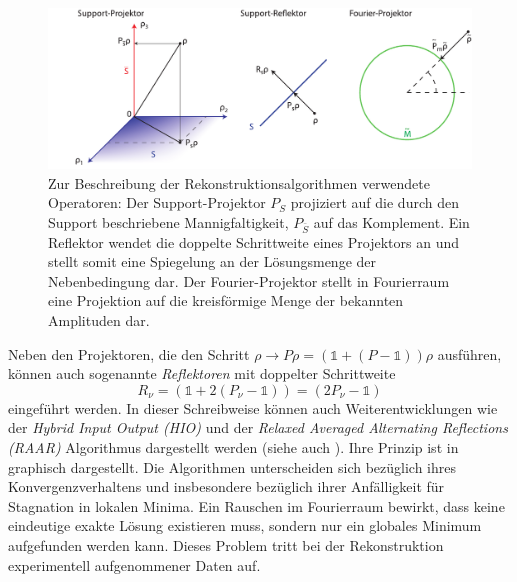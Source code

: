 \begin{figure}
	\centering
	\includegraphics[width=1\textwidth]{images/projektor.pdf}
	\caption[Operatoren zur Beschreibung der Rekonstruktionsalgorithmen]{Zur Beschreibung der Rekonstruktionsalgorithmen verwendete Operatoren: Der Support-Projektor $P_S$ projiziert auf die durch den Support beschriebene Mannigfaltigkeit, $P_{\bar{S}}$ auf das Komplement. Ein Reflektor wendet die doppelte Schrittweite eines Projektors an und stellt somit eine Spiegelung an der Lösungsmenge der Nebenbedingung dar. Der Fourier-Projektor stellt in Fourierraum eine Projektion auf die kreisförmige Menge der bekannten Amplituden dar.}
	\label{fig:projektoren}
\end{figure}
Neben den Projektoren, die den Schritt $\rho \rightarrow P\rho = (\mathbb{1}+(P-\mathbb{1}))\rho$ ausführen, können auch sogenannte \textit{Reflektoren} mit doppelter Schrittweite
\begin{equation}
	R_\nu= (\mathbb{1}+2(P_\nu-\mathbb{1}))=(2P_\nu-\mathbb{1})
\end{equation}
eingeführt werden.
In dieser Schreibweise können auch Weiterentwicklungen wie der \textit{Hybrid Input Output (HIO)} und  der \textit{Relaxed Averaged Alternating Reflections (RAAR)} Algorithmus dargestellt werden (siehe auch ). Ihre Prinzip ist in  graphisch dargestellt. Die Algorithmen unterscheiden sich bezüglich ihres Konvergenzverhaltens und insbesondere bezüglich ihrer Anfälligkeit für Stagnation in lokalen Minima. 
Ein Rauschen im Fourierraum bewirkt, dass keine eindeutige exakte Lösung existieren muss, sondern nur ein globales Minimum aufgefunden werden kann. Dieses Problem tritt bei der Rekonstruktion experimentell aufgenommener Daten auf.
